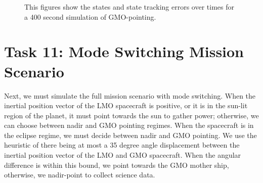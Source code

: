 \documentclass[paper]{aiaaNew}
\begin{document}
\begin{figure}[!htbp]
\centering     %
{}
\caption{This figures show the states and state tracking errors over times for a 400 second simulation of GMO-pointing.}
\end{figure}






\clearpage
\section*{Task 11: Mode Switching Mission Scenario}
Next, we must simulate the full mission scenario with mode switching. When the inertial position vector of the LMO spacecraft is positive, or it is in the sun-lit region of the planet, it must point towards the sun to gather power; otherwise, we can choose between nadir and GMO pointing regimes. When the spacecraft is in the eclipse regime, we must decide between nadir and GMO pointing. We use the heuristic of there being at most a 35 degree angle displacement between the inertial position vector of the LMO and GMO spacecraft. When the angular difference is within this bound, we point towards the GMO mother ship, otherwise, we nadir-point to collect science data.
\end{document}
